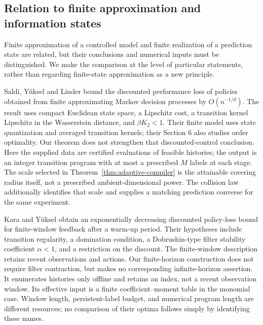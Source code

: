 \subsection{Relation to finite approximation and information states}
Finite approximation of a controlled model and finite realization of a
prediction state are related, but their conclusions and numerical inputs
must be distinguished. We make the comparison at the level of particular
statements, rather than regarding finite-state approximation as a new
principle.

Saldi, Y\"uksel and Linder \cite[Theorem 5.3]{SaldiYukselLinder}
bound the discounted performance loss of policies obtained from finite
approximating Markov decision processes by $O(n^{-1/d})$. The result
uses compact Euclidean state space, a Lipschitz cost, a transition kernel
Lipschitz in the Wasserstein distance, and $\beta K_2<1$. Their finite
model uses state quantization and averaged transition kernels; their
Section 6 also studies order optimality. Our theorem does not strengthen
that discounted-control conclusion. Here the supplied data are certified
evaluations of feasible histories; the output is an integer transition
program with at most a prescribed $M$ labels at each stage. The scale
selected in Theorem~\ref{thm:adaptive-compiler} is the attainable
covering radius itself, not a prescribed ambient-dimensional power.
The collision law additionally identifies that scale and supplies a
matching prediction converse for the same experiment.

Kara and Y\"uksel \cite[Assumption 4 and Theorem 12]{KaraYuksel}
obtain an exponentially decreasing discounted policy-loss bound for
finite-window feedback after a warm-up period. Their hypotheses include
transition regularity, a domination condition, a Dobrushin-type filter
stability coefficient $\alpha<1$, and a restriction on the discount.
The finite-window description retains recent observations and actions.
Our finite-horizon construction does not require filter contraction,
but makes no corresponding infinite-horizon assertion. It enumerates
histories only offline and retains an index, not a recent observation
window. Its effective input is a finite coefficient--moment table in
the monomial case. Window length, persistent-label budget, and numerical
program length are different resources; no comparison of their optima
follows simply by identifying these names.


